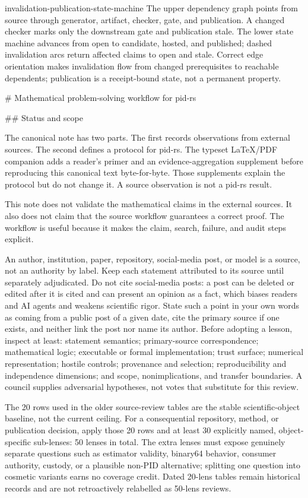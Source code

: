 \documentclass[11pt]{article}
\begin{document}
\PidWorkflowFigure
  {invalidation-publication-state-machine}
  {The upper dependency graph points from source through generator, artifact, checker, gate, and publication. A changed checker marks only the downstream gate and publication stale. The lower state machine advances from open to candidate, hosted, and published; dashed invalidation arcs return affected claims to open and stale.}
  {Correct edge orientation makes invalidation flow from changed prerequisites to reachable dependents; publication is a receipt-bound state, not a permanent property.}
\FloatBarrier
\begin{markdown}
# Mathematical problem-solving workflow for pid-rs

## Status and scope

The canonical note has two parts. The first records observations from external sources. The second
defines a protocol for pid-rs. The typeset LaTeX/PDF companion adds a reader's primer and an
evidence-aggregation supplement before reproducing this canonical text byte-for-byte. Those
supplements explain the protocol but do not change it. A source observation is not a pid-rs result.

This note does not validate the mathematical claims in the external sources. It also does not claim
that the source workflow guarantees a correct proof. The workflow is useful because it makes the
claim, search, failure, and audit steps explicit.

An author, institution, paper, repository, social-media post, or model is a source, not an authority
by label. Keep each statement attributed to its source until separately adjudicated. Do not cite
social-media posts: a post can be deleted or edited after it is cited and can present an opinion as
a fact, which biases readers and AI agents and weakens scientific rigor. State such a point in your
own words as coming from a public post of a given date, cite the primary source if one exists, and
neither link the post nor name its author. Before adopting a lesson,
inspect at least: statement semantics; primary-source correspondence; mathematical logic; executable
or formal implementation; trust surface; numerical representation; hostile controls; provenance
and selection; reproducibility and independence dimensions; and scope, nonimplications, and transfer
boundaries. A council supplies adversarial hypotheses, not votes that substitute for this review.

The 20 rows used in the older source-review tables are the stable scientific-object baseline, not
the current ceiling. For a consequential repository, method, or publication decision, apply those
20 rows and at least 30 explicitly named, object-specific sub-lenses: 50 lenses in total. The extra
lenses must expose genuinely separate questions such as estimator validity, binary64 behavior,
consumer authority, custody, or a plausible non-PID alternative; splitting one question into
cosmetic variants earns no coverage credit. Dated 20-lens tables remain historical records and are
not retroactively relabelled as 50-lens reviews.


\end{markdown}
\end{document}
